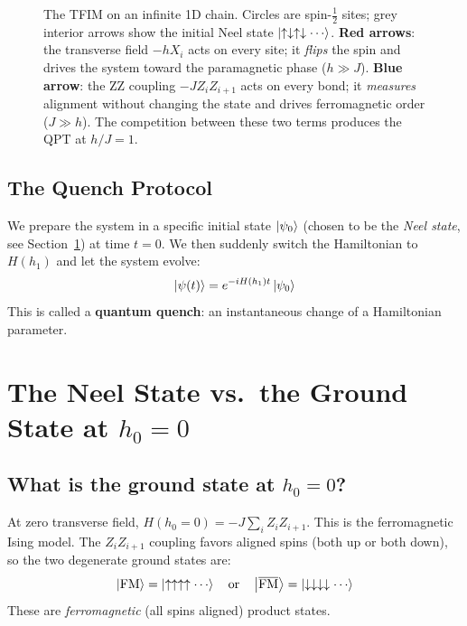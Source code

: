\documentclass[11pt, a4paper]{article}
\begin{document}
\begin{figure}[h]
\begin{tikzpicture}
\end{tikzpicture}
\vspace{2pt}
\caption{The TFIM on an infinite 1D chain.
Circles are spin-$\frac{1}{2}$ sites; grey interior arrows show the initial
Neel state $\ket{\uparrow\downarrow\uparrow\downarrow\cdots}$.
\textbf{\textcolor{red!75!black}{Red arrows}}: the transverse field
$-hX_i$ acts on every site; it \emph{flips} the spin and drives the
system toward the paramagnetic phase ($h\gg J$).
\textbf{\textcolor{blue!65!black}{Blue arrow}}: the ZZ coupling
$-JZ_iZ_{i+1}$ acts on every bond; it \emph{measures} alignment without
changing the state and drives ferromagnetic order ($J\gg h$).
The competition between these two terms produces the QPT at $h/J=1$.}
\label{fig:hamiltonian}
\end{figure}

\subsection{The Quench Protocol}

We prepare the system in a specific initial state $\ket{\psi_0}$ (chosen to be the \emph{Neel state}, see Section~\ref{sec:neel}) at time $t = 0$. We then suddenly switch the Hamiltonian to $H(h_1)$ and let the system evolve:
\begin{equation}
  \ket{\psi(t)} = e^{-i H(h_1) t} \ket{\psi_0}
\end{equation}
This is called a \textbf{quantum quench}: an instantaneous change of a Hamiltonian parameter.

\section{The Neel State vs.\ the Ground State at $h_0 = 0$}
\label{sec:neel}

\subsection{What is the ground state at $h_0 = 0$?}

At zero transverse field, $H(h_0 = 0) = -J \sum_i Z_i Z_{i+1}$. This is the ferromagnetic Ising model. The $Z_i Z_{i+1}$ coupling favors aligned spins (both up or both down), so the two degenerate ground states are:
\begin{equation}
  \ket{\text{FM}} = \ket{\uparrow\uparrow\uparrow\uparrow\cdots}
  \quad \text{or} \quad
  \ket{\overline{\text{FM}}} = \ket{\downarrow\downarrow\downarrow\downarrow\cdots}
\end{equation}
These are \emph{ferromagnetic} (all spins aligned) product states.
\end{document}
